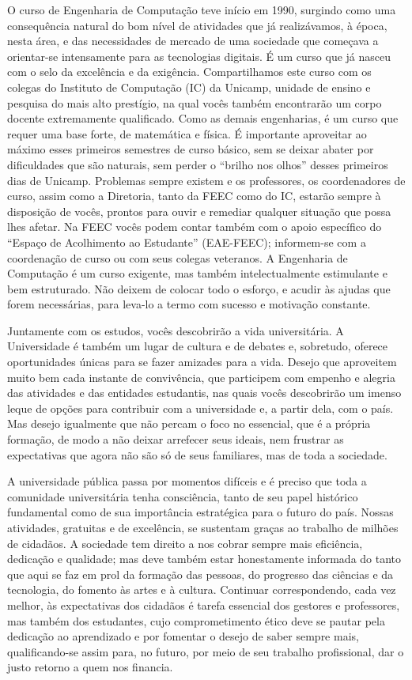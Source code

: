 O curso de Engenharia de Computação teve início em 1990, surgindo como uma
consequência natural do bom nível de atividades que já realizávamos, à época,
nesta área, e das necessidades de mercado de uma sociedade que começava a
orientar-se intensamente para as tecnologias digitais. É um curso que já nasceu
com o selo da excelência e da exigência. Compartilhamos este curso com os
colegas do Instituto de Computação (IC) da Unicamp, unidade de ensino e
pesquisa do mais alto prestígio, na qual vocês também encontrarão um corpo
docente extremamente qualificado. Como as demais engenharias, é um curso que
requer uma base forte, de matemática e física. É importante aproveitar ao
máximo esses primeiros semestres de curso básico, sem se deixar abater por
dificuldades que são naturais, sem perder o ``brilho nos olhos'' desses
primeiros dias de Unicamp. Problemas sempre existem e os professores, os
coordenadores de curso, assim como a Diretoria, tanto da FEEC como do IC,
estarão sempre à disposição de vocês, prontos para ouvir e remediar qualquer
situação que possa lhes afetar. Na FEEC vocês podem contar também com o apoio
específico do ``Espaço de Acolhimento ao Estudante'' (EAE-FEEC); informem-se
com a coordenação de curso ou com seus colegas veteranos. A Engenharia de
Computação é um curso exigente, mas também intelectualmente estimulante e bem
estruturado. Não deixem de colocar todo o esforço, e acudir às ajudas que forem
necessárias, para leva-lo a termo com sucesso e motivação constante.

Juntamente com os estudos, vocês descobrirão a vida universitária. A 
Universidade é também um lugar de cultura e de debates e, sobretudo, oferece 
oportunidades únicas para se fazer amizades para a vida. Desejo que aproveitem 
muito bem cada instante de convivência, que participem com empenho e alegria 
das atividades e das entidades estudantis, nas quais vocês descobrirão um 
imenso leque de opções para contribuir com a universidade e, a partir dela, com 
o país. Mas desejo igualmente que não percam o foco no essencial, que é a 
própria formação, de modo a não deixar arrefecer seus ideais, nem frustrar as 
expectativas que agora não são só de seus familiares, mas de toda a sociedade.

A universidade pública passa por momentos difíceis e é preciso que toda a 
comunidade universitária tenha consciência, tanto de seu papel histórico 
fundamental como de sua importância estratégica para o futuro do país. Nossas 
atividades, gratuitas e de excelência, se sustentam graças ao trabalho de 
milhões de cidadãos. A sociedade tem direito a nos cobrar sempre mais 
eficiência, dedicação e qualidade; mas deve também estar honestamente informada 
do tanto que aqui se faz em prol da formação das pessoas, do progresso das 
ciências e da tecnologia, do fomento às artes e à cultura. Continuar 
correspondendo, cada vez melhor, às expectativas dos cidadãos é tarefa 
essencial dos gestores e professores, mas também dos estudantes, cujo 
comprometimento ético deve se pautar pela dedicação ao aprendizado e por 
fomentar o desejo de saber sempre mais, qualificando-se assim para, no futuro, 
por meio de seu trabalho profissional, dar o justo retorno a quem nos financia.

